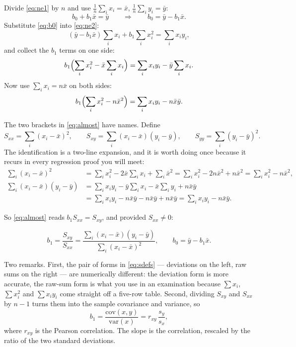 \documentclass[11pt]{article}
\begin{document}
Divide \eqref{eq:ne1} by $n$ and use $\frac1n\sum_i x_i = \bar x$,
$\frac1n\sum_i y_i = \bar y$:
\begin{equation}
  b_0 + b_1\bar x = \bar y
  \qquad\Longrightarrow\qquad
  b_0 = \bar y - b_1\bar x .
  \label{eq:b0}
\end{equation}
Substitute \eqref{eq:b0} into \eqref{eq:ne2}:
\[
  (\bar y - b_1\bar x)\sum_i x_i + b_1\sum_i x_i^2 = \sum_i x_iy_i ,
\]
and collect the $b_1$ terms on one side:
\[
  b_1\Bigl(\sum_i x_i^2 - \bar x\sum_i x_i\Bigr)
    = \sum_i x_iy_i - \bar y\sum_i x_i .
\]
Now use $\sum_i x_i = n\bar x$ on both sides:
\begin{equation}
  b_1\Bigl(\sum_i x_i^2 - n\bar x^2\Bigr)
    = \sum_i x_iy_i - n\bar x\bar y .
  \label{eq:almost}
\end{equation}

The two brackets in \eqref{eq:almost} have names. Define
\begin{equation}
  S_{xx} = \sum_i (x_i - \bar x)^2, \qquad
  S_{xy} = \sum_i (x_i - \bar x)(y_i - \bar y), \qquad
  S_{yy} = \sum_i (y_i - \bar y)^2 .
  \label{eq:sdefs}
\end{equation}
The identification is a two-line expansion, and it is worth doing once because
it recurs in every regression proof you will meet:
\begin{align*}
  \sum_i (x_i-\bar x)^2
    &= \sum_i x_i^2 - 2\bar x\sum_i x_i + \sum_i \bar x^2
     = \sum_i x_i^2 - 2n\bar x^2 + n\bar x^2
     = \sum_i x_i^2 - n\bar x^2,\\
  \sum_i (x_i-\bar x)(y_i-\bar y)
    &= \sum_i x_iy_i - \bar y\sum_i x_i - \bar x\sum_i y_i + n\bar x\bar y\\
    &= \sum_i x_iy_i - n\bar x\bar y - n\bar x\bar y + n\bar x\bar y
     = \sum_i x_iy_i - n\bar x\bar y .
\end{align*}

So \eqref{eq:almost} reads $b_1S_{xx} = S_{xy}$, and provided $S_{xx}\neq 0$:

\begin{keyidea}
\[
  \boxed{\;b_1 = \frac{S_{xy}}{S_{xx}}
    = \frac{\sum_i (x_i-\bar x)(y_i-\bar y)}{\sum_i (x_i-\bar x)^2},
  \qquad
  b_0 = \bar y - b_1\bar x .\;}
\]
\end{keyidea}

Two remarks. First, the pair of forms in \eqref{eq:sdefs} --- deviations on
the left, raw sums on the right --- are numerically different: the deviation
form is more accurate, the raw-sum form is what you use in an examination
because $\sum x_i$, $\sum x_i^2$ and $\sum x_iy_i$ come straight off a
five-row table. Second, dividing $S_{xy}$ and $S_{xx}$ by $n-1$ turns them
into the sample covariance and variance, so
\begin{equation}
  b_1 = \frac{\mathrm{cov}(x,y)}{\mathrm{var}(x)}
      = r_{xy}\,\frac{s_y}{s_x},
  \label{eq:slopecorr}
\end{equation}
where $r_{xy}$ is the Pearson correlation. The slope is the correlation,
rescaled by the ratio of the two standard deviations.
\end{document}
